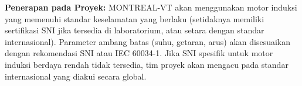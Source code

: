 \documentclass{elsinta}
\begin{document}
\textbf{Penerapan pada Proyek:} MONTREAL-VT akan menggunakan motor induksi yang memenuhi standar keselamatan yang berlaku (setidaknya memiliki sertifikasi SNI jika tersedia di laboratorium, atau setara dengan standar internasional). Parameter ambang batas (suhu, getaran, arus) akan disesuaikan dengan rekomendasi SNI atau IEC 60034-1. Jika SNI spesifik untuk motor induksi berdaya rendah tidak tersedia, tim proyek akan mengacu pada standar internasional yang diakui secara global.

\section{\ReferencesTitle}
\renewcommand{\refname}{}      %





\section{\AbbrevTitle}
\end{document}
